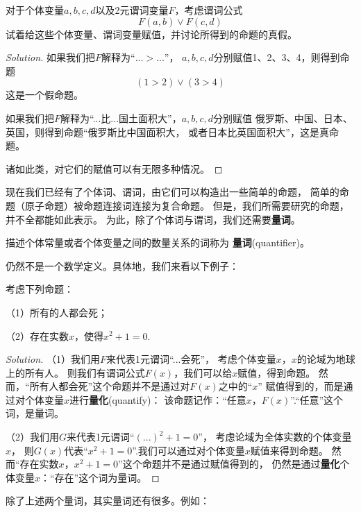 \begin{example}
对于个体变量$a,b,c,d$以及2元谓词变量$F$，考虑谓词公式
$$F(a,b)\vee F(c,d)$$
试着给这些个体变量、谓词变量赋值，并讨论所得到的命题的真假。
\end{example}

\begin{proof}[Solution]
如果我们把$F$解释为“$...>...$”，
$a,b,c,d$分别赋值1、2、3、4，则得到命题
$$(1>2)\vee(3>4)$$
这是一个假命题。

如果我们把$F$解释为“...比...国土面积大”，$a,b,c,d$分别赋值
俄罗斯、中国、日本、英国，则得到命题“俄罗斯比中国面积大，
或者日本比英国面积大”，这是真命题。

诸如此类，对它们的赋值可以有无限多种情况。
\end{proof}\vs

现在我们已经有了个体词、谓词，由它们可以构造出一些简单的命题，
简单的命题（原子命题）被命题连接词连接为复合命题。
但是，我们所需要研究的命题，并不全都能如此表示。
为此，除了个体词与谓词，我们还需要\textbf{量词}。

\begin{definition}
描述个体常量或者个体变量之间的数量关系的词称为
\textbf{量词}(quantifier)。
\end{definition}

仍然不是一个数学定义。具体地，我们来看以下例子：

\begin{example}[量词的例子]\label{量词的基本例子}
考虑下列命题：

（1）所有的人都会死；

（2）存在实数$x$，使得$x^2+1=0$.
\end{example}

\begin{proof}[Solution]
（1）我们用$F$来代表1元谓词“...会死”，
考虑个体变量$x$，$x$的论域为地球上的所有人。
则我们有谓词公式$F(x)$，我们可以给$x$赋值，得到命题。
然而，“所有人都会死”这个命题并不是通过对$F(x)$之中的“$x$”
赋值得到的，而是通过对个体变量$x$进行\textbf{量化}(quantify)：
该命题记作：“任意$x$，$F(x)$”.“任意”这个词，是量词。

（2）我们用$G$来代表1元谓词“$(...)^2+1=0$”，
考虑论域为全体实数的个体变量$x$，
则$G(x)$代表“$x^2+1=0$”.我们可以通过对个体变量$x$赋值来得到命题。
然而“存在实数$x$，$x^2+1=0$”这个命题并不是通过赋值得到的，
仍然是通过\textbf{量化}个体变量$x$：“存在”这个词为量词。
\end{proof}

除了上述两个量词，其实量词还有很多。例如：

